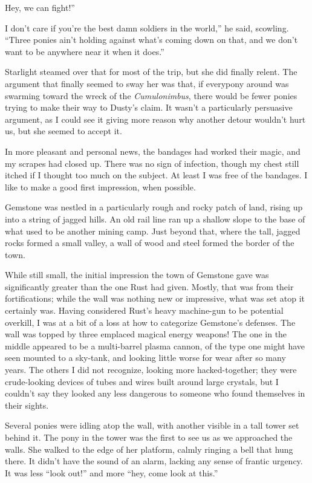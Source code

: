 \leavevmode{}Hey, we can fight!”

\leavevmode{}I don’t care if you’re the best damn soldiers in the world,” he said, scowling. “Three ponies ain’t holding against what’s coming down on that, and we don’t want to be anywhere near it when it does.”

Starlight steamed over that for most of the trip, but she did finally relent. The argument that finally seemed to sway her was that, if everypony around was swarming toward the wreck of the \textit{Cumulonimbus}, there would be fewer ponies trying to make their way to Dusty’s claim. It wasn’t a particularly persuasive argument, as I could see it giving more reason why another detour wouldn’t hurt us, but she seemed to accept it.

In more pleasant and personal news, the bandages had worked their magic, and my scrapes had closed up. There was no sign of infection, though my chest still itched if I thought too much on the subject. At least I was free of the bandages. I like to make a good first impression, when possible.

Gemstone was nestled in a particularly rough and rocky patch of land, rising up into a string of jagged hills. An old rail line ran up a shallow slope to the base of what used to be another mining camp. Just beyond that, where the tall, jagged rocks formed a small valley, a wall of wood and steel formed the border of the town.

While still small, the initial impression the town of Gemstone gave was significantly greater than the one Rust had given. Mostly, that was from their fortifications; while the wall was nothing new or impressive, what was set atop it certainly was. Having considered Rust’s heavy machine-gun to be potential overkill, I was at a bit of a loss at how to categorize Gemstone’s defenses. The wall was topped by three emplaced magical energy weapons! The one in the middle appeared to be a multi-barrel plasma cannon, of the type one might have seen mounted to a sky-tank, and looking little worse for wear after so many years. The others I did not recognize, looking more hacked-together; they were crude-looking devices of tubes and wires built around large crystals, but I couldn’t say they looked any less dangerous to someone who found themselves in their sights.

Several ponies were idling atop the wall, with another visible in a tall tower set behind it. The pony in the tower was the first to see us as we approached the walls. She walked to the edge of her platform, calmly ringing a bell that hung there. It didn’t have the sound of an alarm, lacking any sense of frantic urgency. It was less “look out!” and more “hey, come look at this.”

